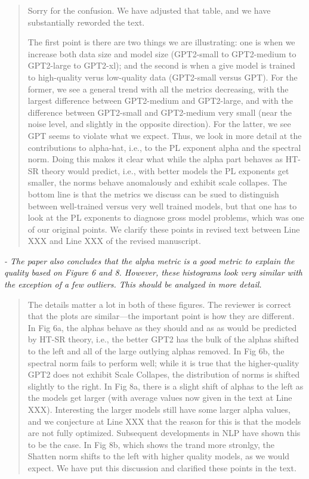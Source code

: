 \documentclass[11pt]{article}
\begin{document}
\begin{quote}
Sorry for the confusion.
We have adjusted that table, and we have substantially reworded the text.

The first point is there are two things we are illustrating: one is when we increase both data size and model size (GPT2-small to GPT2-medium to GPT2-large to GPT2-xl); and the second is when a give model is trained to high-quality verus low-quality data (GPT2-small versus GPT).
For the former, we see a general trend with all the metrics decreasing, with the largest difference between GPT2-medium and GPT2-large, and with the difference between GPT2-small and GPT2-medium very small (near the noise level, and slightly in the opposite direction).
For the latter, we see GPT seems to violate what we expect. 
Thus, we look in more detail at the contributions to alpha-hat, i.e., to the PL exponent alpha and the spectral norm.
Doing this makes it clear what while the alpha part behaves as HT-SR theory would predict, i.e., with better models the PL exponents get smaller, the norms behave anomalously and exhibit scale collapes.
The bottom line is that the metrics we discuss can be sued to distinguish between well-trained versus very well trained models, but that one has to look at the PL exponents to diagnose gross model problems, which was one of our original points.
We clarify these points in revised text between Line XXX and Line XXX of the revised manuscript.
\end{quote}

\noindent
\emph{%
- The paper also concludes that the alpha metric is a good metric to explain the quality based on Figure 6 and 8. However, these histograms look very similar with the exception of a few outliers. This should be analyzed in more detail.
}

\begin{quote}
The details matter a lot in both of these figures.
The reviewer is correct that the plots are similar---the important point is how they are different.
In Fig 6a, the alphas behave as they should and as as would be predicted by HT-SR theory, i.e., the better GPT2 has the bulk of the alphas shifted to the left and all of the large outlying alphas removed. 
In Fig 6b, the spectral norm fails to perform well; while it is true that the higher-quality GPT2 does not exhibit Scale Collapes, the distribution of norms is shifted slightly to the right.
In Fig 8a, there is a slight shift of alphas to the left as the models get larger (with average values now given in the text at Line XXX).
Interesting the larger models still have some larger alpha values, and we conjecture at Line XXX that the reason for this is that the models are not fully optimized.  
Subsequent developments in NLP have shown this to be the case.
In Fig 8b, which shows the trand more stronlgy, the Shatten norm shifts to the left with higher quality models, as we would expect.
We have put this discussion and clarified these points in the text.
\end{quote}
\end{document}
